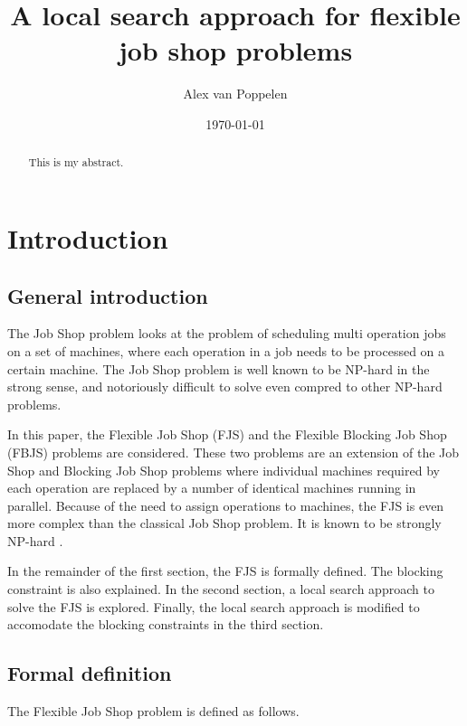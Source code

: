 \documentclass[a4paper,12pt]{article}
\begin{document}
\title{A local search approach for flexible job shop problems}
\author{Alex van Poppelen}
\date{\today}
\maketitle

\begin{abstract}

This is my abstract.

\end{abstract}

\tableofcontents

\section{Introduction}

\subsection{General introduction}

The Job Shop problem looks at the problem of scheduling multi operation jobs on a set of machines, where each operation in a job needs to be processed on a certain machine. The Job Shop problem is well known to be NP-hard in the strong sense, and notoriously difficult to solve even compred to other NP-hard problems.

In this paper, the Flexible Job Shop (FJS) and the Flexible Blocking Job Shop (FBJS) problems are considered. These two problems are an extension of the Job Shop and Blocking Job Shop problems where individual machines required by each operation are replaced by a number of identical machines running in parallel. Because of the need to assign operations to machines, the FJS is even more complex than the classical Job Shop problem. It is known to be strongly NP-hard \cite{approxfjsp}.

In the remainder of the first section, the FJS is formally defined. The blocking constraint is also explained. In the second section, a local search approach to solve the FJS is explored. Finally, the local search approach is modified to accomodate the blocking constraints in the third section.

\subsection{Formal definition}

The Flexible Job Shop problem is defined as follows.
\end{document}
